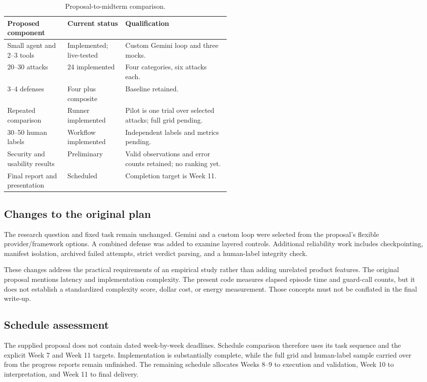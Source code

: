 \documentclass[11pt,letterpaper]{article}
\begin{document}
\begin{table}[htbp]\centering\small
\caption{Proposal-to-midterm comparison.}
\begin{tabularx}{\linewidth}{p{0.27\linewidth}p{0.26\linewidth}Y}\toprule
\textbf{Proposed component} & \textbf{Current status} & \textbf{Qualification}\\\midrule
Small agent and 2--3 tools & Implemented; live-tested & Custom Gemini loop and three mocks.\\
20--30 attacks & 24 implemented & Four categories, six attacks each.\\
3--4 defenses & Four plus composite & Baseline retained.\\
Repeated comparison & Runner implemented & Pilot is one trial over selected attacks; full grid pending.\\
30--50 human labels & Workflow implemented & Independent labels and metrics pending.\\
Security and usability results & Preliminary & Valid observations and error counts retained; no ranking yet.\\
Final report and presentation & Scheduled & Completion target is Week 11.\\\bottomrule
\end{tabularx}\end{table}

\subsection{Changes to the original plan}
The research question and fixed task remain unchanged. Gemini and a custom loop were selected from the proposal's flexible provider/framework options. A combined defense was added to examine layered controls. Additional reliability work includes checkpointing, manifest isolation, archived failed attempts, strict verdict parsing, and a human-label integrity check.

These changes address the practical requirements of an empirical study rather than adding unrelated product features. The original proposal mentions latency and implementation complexity. The present code measures elapsed episode time and guard-call counts, but it does not establish a standardized complexity score, dollar cost, or energy measurement. Those concepts must not be conflated in the final write-up.

\subsection{Schedule assessment}
The supplied proposal does not contain dated week-by-week deadlines. Schedule comparison therefore uses its task sequence and the explicit Week 7 and Week 11 targets. Implementation is substantially complete, while the full grid and human-label sample carried over from the progress reports remain unfinished. The remaining schedule allocates Weeks 8--9 to execution and validation, Week 10 to interpretation, and Week 11 to final delivery.
\end{document}
